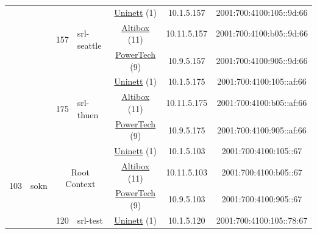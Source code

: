 \begin{small}
\begin{center}
\begin{longtable}{|c|c|c|c|c|c|c|c|}
  &  & \multirow{3}{*}{\tiny{157}} & \multicolumn{1}{|l|}{\multirow{3}{*}{\tiny{srl-seattle}}} & \multicolumn{2}{|c|}{\tiny{\href{https://www.uninett.no}{Uninett} (1)}} & \tiny{10.1.5.157} & \tiny{2001:700:4100:105::9d:66} \\* \cline{5-5}\cline{6-6}\cline{7-7}\cline{8-8}
  &  &  &  & \multicolumn{2}{|c|}{\tiny{\href{https://www.altibox.no}{Altibox} (11)}} & \tiny{10.11.5.157} & \tiny{2001:700:4100:b05::9d:66} \\* \cline{5-5}\cline{6-6}\cline{7-7}\cline{8-8}
  &  &  &  & \multicolumn{2}{|c|}{\tiny{\href{http://www.powertech.no}{PowerTech} (9)}} & \tiny{10.9.5.157} & \tiny{2001:700:4100:905::9d:66} \\* \cline{3-3}\cline{4-4}\cline{5-5}\cline{6-6}\cline{7-7}\cline{8-8}
  &  & \multirow{3}{*}{\tiny{175}} & \multicolumn{1}{|l|}{\multirow{3}{*}{\tiny{srl-thuen}}} & \multicolumn{2}{|c|}{\tiny{\href{https://www.uninett.no}{Uninett} (1)}} & \tiny{10.1.5.175} & \tiny{2001:700:4100:105::af:66} \\* \cline{5-5}\cline{6-6}\cline{7-7}\cline{8-8}
  &  &  &  & \multicolumn{2}{|c|}{\tiny{\href{https://www.altibox.no}{Altibox} (11)}} & \tiny{10.11.5.175} & \tiny{2001:700:4100:b05::af:66} \\* \cline{5-5}\cline{6-6}\cline{7-7}\cline{8-8}
  &  &  &  & \multicolumn{2}{|c|}{\tiny{\href{http://www.powertech.no}{PowerTech} (9)}} & \tiny{10.9.5.175} & \tiny{2001:700:4100:905::af:66} \\ \hline
 \multirow{36}{*}{\tiny{103}} & \multicolumn{1}{|l|}{\multirow{36}{*}{\tiny{sokn}}} & \multicolumn{2}{|c|}{\multirow{3}{*}{\tiny{Root Context}}} & \multicolumn{2}{|c|}{\tiny{\href{https://www.uninett.no}{Uninett} (1)}} & \tiny{10.1.5.103} & \tiny{2001:700:4100:105::67} \\* \cline{5-5}\cline{6-6}\cline{7-7}\cline{8-8}
  &  & \multicolumn{2}{|c|}{} & \multicolumn{2}{|c|}{\tiny{\href{https://www.altibox.no}{Altibox} (11)}} & \tiny{10.11.5.103} & \tiny{2001:700:4100:b05::67} \\* \cline{5-5}\cline{6-6}\cline{7-7}\cline{8-8}
  &  & \multicolumn{2}{|c|}{} & \multicolumn{2}{|c|}{\tiny{\href{http://www.powertech.no}{PowerTech} (9)}} & \tiny{10.9.5.103} & \tiny{2001:700:4100:905::67} \\* \cline{3-3}\cline{4-4}\cline{5-5}\cline{6-6}\cline{7-7}\cline{8-8}
  &  & \multirow{3}{*}{\tiny{120}} & \multicolumn{1}{|l|}{\multirow{3}{*}{\tiny{srl-test}}} & \multicolumn{2}{|c|}{\tiny{\href{https://www.uninett.no}{Uninett} (1)}} & \tiny{10.1.5.120} & \tiny{2001:700:4100:105::78:67} \\* \cline{5-5}\cline{6-6}\cline{7-7}\cline{8-8}

\end{longtable}
\end{center}
\end{small}
